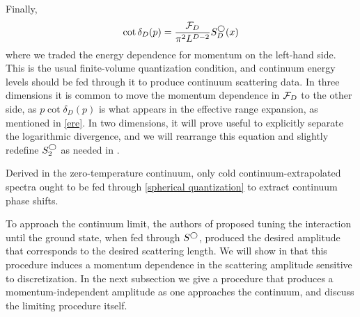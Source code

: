 Finally,
\begin{equation}\label{eq:spherical quantization}
    \cot \delta_{D}(p) = \frac{\mathcal{F}_{D}}{\pi^2 L^{D-2}} S^\bigcirc_D(x)
\end{equation}
where we traded the energy dependence for momentum on the left-hand side.
This is the usual \Luscher finite-volume quantization condition, and continuum energy levels should be fed through it to produce continuum scattering data.
In three dimensions it is common to move the momentum dependence in $\mathcal{F}_{D}$ to the other side, as $p \cot\delta_{D}(p)$ is what appears in the effective range expansion, as mentioned in \eqref{ere}.
In two dimensions, it will prove useful to explicitly separate the logarithmic divergence, and we will rearrange this equation and slightly redefine $S^\bigcirc_2$ as needed in .

Derived in the zero-temperature continuum, only cold continuum-extrapolated spectra ought to be fed through \eqref{spherical quantization} to extract continuum phase shifts.

To approach the continuum limit, the authors of  proposed tuning the interaction until the ground state, when fed through $S^\bigcirc$, produced the desired amplitude that corresponds to the desired scattering length.
We will show in  that this procedure induces a momentum dependence in the scattering amplitude sensitive to discretization.
In the next subsection we give a procedure that produces a momentum-independent amplitude as one approaches the continuum, and discuss the limiting procedure itself.
